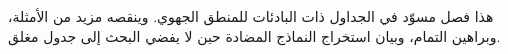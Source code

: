 \documentclass[../../../include/open-logic-chapter]{subfiles}
\begin{document}

\begin{editorial}
  هذا فصل مسوّد في الجداول ذات البادئات للمنطق الجهوي. وينقصه مزيد
  من الأمثلة، وبراهين التمام، وبيان استخراج النماذج المضادة حين لا
  يفضي البحث إلى جدول مغلق.
\end{editorial}


\OLEndChapterHook
\end{document}
